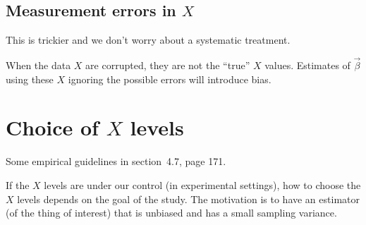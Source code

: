 \documentclass[12pt]{article}
\begin{document}
\subsection{Measurement errors in $X$}

This is trickier and we don't worry about a systematic treatment.

When the data $X$ are corrupted, they are not the ``true'' $X$ values.
Estimates of $\vec\beta$ using these $X$ ignoring the
possible errors will introduce bias.


\section{Choice of $X$ levels}

Some empirical guidelines in section~4.7, page 171.

If the $X$ levels are under our control (\eg in experimental settings),
how to choose the $X$ levels depends on the goal of the study.
The motivation is to have an estimator (of the thing of interest)
that is unbiased and has a small sampling variance.
\end{document}
